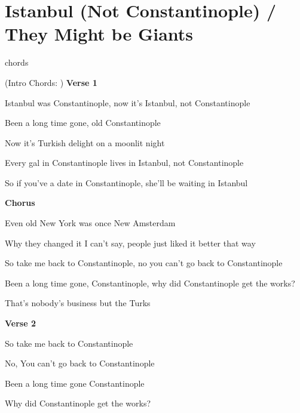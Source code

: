 \section{Istanbul (Not Constantinople) / They Might be Giants}\label{sec:istanbulnotconstantinople}
  {\small chords}
  
  \Aminor
  \Eseven
  \Dminor
  \BminorSeven
  \Eminor
  
(Intro Chords:          )
\textbf{Verse 1}
                                 
Istanbul was Constantinople, now it's Istanbul, not Constantinople

Been a long time gone, old Constantinople

Now it's Turkish delight on a moonlit night

Every gal in Constantinople lives in Istanbul, not Constantinople

So if you've a date in Constantinople, she'll be waiting in Istanbul

\textbf{Chorus}

Even old New York was once New Amsterdam

Why they changed it I can't say, people just liked it better that way

So take me back to Constantinople, no you can't go back to Constantinople

Been a long time gone,  Constantinople, why did Constantinople get the works?

That's nobody's business but the Turks

\textbf{Verse 2}
                         
So take me back to Constantinople

No, You can't go back to Constantinople
         
Been a long time gone Constantinople

Why did Constantinople get the works?

